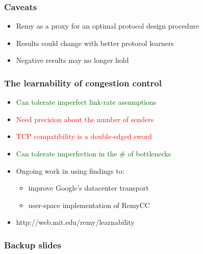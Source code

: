 \documentclass[svgnames]{beamer}
\begin{document}
\begin{Large}






% 



\begin{frame}
\frametitle{Caveats}
\begin{itemize}
\item<2-> Remy as a proxy for an optimal protocol design procedure
\item<3-> Results could change with better protocol learners
\item<4-> Negative results may no longer hold
\end{itemize}
\end{frame}

\begin{frame}
\frametitle{The learnability of congestion control}
\noindent
\begin{itemize}
\item<2-> \textcolor{darkgreen}{Can tolerate imperfect link-rate assumptions}
\item<3-> \textcolor{red}{Need precision about the number of senders}
\item<4-> \textcolor{red}{TCP compatibility is a double-edged sword}
\item<5-> \textcolor{darkgreen}{Can tolerate imperfection in the \# of bottlenecks}
\item<6-> Ongoing work in using findings to:
\begin{itemize}
\item<7-> improve Google's datacenter transport
\item<8-> user-space implementation of RemyCC
\end{itemize}
\item<9-> http://web.mit.edu/remy/learnability
\end{itemize}
\end{frame}

\end{Large}

\begin{frame}[noframenumbering]
\frametitle{Backup slides}
\end{frame}


\end{document}
